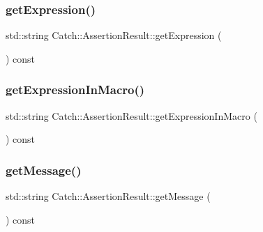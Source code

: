 \hypertarget{class_catch_1_1_assertion_result_a26a777f3959353c729544cb2ace0d279}{}\label{class_catch_1_1_assertion_result_a26a777f3959353c729544cb2ace0d279} 
\subsubsection{\texorpdfstring{get\+Expression()}{getExpression()}}
{\footnotesize\ttfamily std\+::string Catch\+::\+Assertion\+Result\+::get\+Expression (\begin{DoxyParamCaption}{ }\end{DoxyParamCaption}) const}

\hypertarget{class_catch_1_1_assertion_result_aac35a0ca42d33bff6467c76573730f5e}{}\label{class_catch_1_1_assertion_result_aac35a0ca42d33bff6467c76573730f5e} 
\subsubsection{\texorpdfstring{get\+Expression\+In\+Macro()}{getExpressionInMacro()}}
{\footnotesize\ttfamily std\+::string Catch\+::\+Assertion\+Result\+::get\+Expression\+In\+Macro (\begin{DoxyParamCaption}{ }\end{DoxyParamCaption}) const}

\hypertarget{class_catch_1_1_assertion_result_ae730943beed46921b09383c673e35786}{}\label{class_catch_1_1_assertion_result_ae730943beed46921b09383c673e35786} 
\subsubsection{\texorpdfstring{get\+Message()}{getMessage()}}
{\footnotesize\ttfamily std\+::string Catch\+::\+Assertion\+Result\+::get\+Message (\begin{DoxyParamCaption}{ }\end{DoxyParamCaption}) const}

